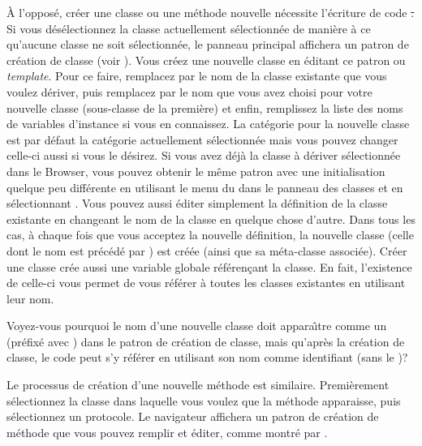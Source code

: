 \documentclass[a4paper,10pt,twoside]{book}
\begin{document}
\`A l'oppos\'e, cr\'eer une classe ou une m\'ethode nouvelle n\'ecessite 
l'\'ecriture de code \st.
Si vous d\'es\'electionnez la classe actuellement s\'electionn\'ee de mani\`ere \`a ce qu'aucune classe ne soit s\'electionn\'ee, le panneau principal 
affichera un patron de cr\'eation de classe
(voir ).
Vous cr\'eez une nouvelle classe en \'editant ce patron ou \emph{template}. Pour ce faire, remplacez  par le nom de la classe existante
que vous voulez d\'eriver, puis remplacez  par le nom
que vous avez choisi pour votre nouvelle classe (sous-classe de la premi\`ere) et enfin, remplissez la liste des noms de variables d'instance si vous en connaissez.  
La cat\'egorie pour la nouvelle classe est par d\'efaut la cat\'egorie actuellement s\'electionn\'ee mais vous pouvez changer celle-ci aussi si vous le d\'esirez.
Si vous avez d\'ej\`a la classe \`a d\'eriver s\'electionn\'ee dans 
le Browser, vous pouvez obtenir le m\^eme patron avec une initialisation
quelque peu diff\'erente en utilisant le menu du 
dans le panneau des classes et en s\'electionnant 
 .
Vous pouvez aussi \'editer simplement la d\'efinition de la classe existante en changeant le nom de la classe en quelque chose d'autre.
Dans tous les cas, \`a chaque fois que vous acceptez la nouvelle d\'efinition, la nouvelle classe 
(celle dont le nom est pr\'ec\'ed\'e par \ct{#}) est cr\'e\'ee (ainsi que sa m\'eta-classe associ\'ee).  
Cr\'eer une classe cr\'ee aussi une variable globale r\'ef\'eren\c{c}ant
la classe. En fait, l'existence de celle-ci vous permet de vous 
r\'ef\'erer \`a toutes les classes existantes en utilisant leur nom.

Voyez-vous pourquoi le nom d'une nouvelle classe doit appara\^{\i}tre
comme un  (\ie pr\'efix\'e avec \ct{#}) dans le
patron de cr\'eation de classe, mais qu'apr\`es la cr\'eation
de classe, le code peut s'y r\'ef\'erer en utilisant
son nom comme identifiant (\ie sans le \ct{#})?

Le processus de cr\'eation d'une nouvelle m\'ethode
est similaire. Premi\`erement s\'electionnez la classe dans laquelle vous
voulez que la m\'ethode apparaisse, puis s\'electionnez un protocole.
Le navigateur affichera un patron de cr\'eation de m\'ethode que
vous pouvez remplir et \'editer, comme montr\'e par
.
\end{document}
